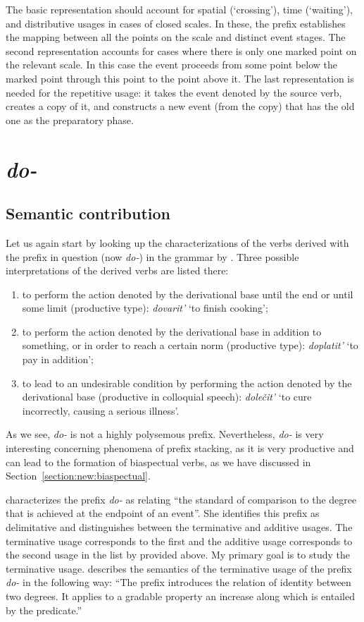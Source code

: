 The basic representation should account for spatial (`crossing'), time (`waiting'), and distributive usages in cases of closed scales. In these, the prefix establishes the mapping between all the points on the scale and distinct event stages. The second representation accounts for cases where there is only one marked point on the relevant scale. In this case the event proceeds from some point below the marked point through this point to the point above it. The last representation is needed for the repetitive usage: it takes the event denoted by the source verb, creates a copy of it, and constructs a new event (from the copy) that has the old one as the preparatory phase.

\section{\textit{do-}}\label{subsection:semantics:do}
\subsection{Semantic contribution}
Let us again start by looking up the characterizations of the verbs derived with the prefix in question (now \textit{do-}) in the grammar by \citet[357--358]{Shvedova:82}. Three possible interpretations of the derived verbs are listed there:
\begin{enumerate}
\item to perform the action denoted by the derivational base until the end or until some limit (productive type): \textit{dovarit'} `to finish cooking';
\item to perform the action denoted by the derivational base in addition to something, or in order to reach a certain norm (productive type): \textit{doplatit'} `to pay in addition';
\item to lead to an undesirable condition by performing the action denoted by the derivational base (productive in colloquial speech): \textit{dole\v{c}it'} `to cure incorrectly, causing a serious illness'.
\end{enumerate}

As we see, \textit{do-} is not a highly polysemous prefix. Nevertheless, \textit{do-} is very interesting concerning phenomena of prefix stacking, as it is very productive and can lead to the formation of biaspectual verbs, as we have discussed in Section~\ref{section:new:biaspectual}. 

\citet[70]{Kagan:book} characterizes the prefix \textit{do-} as relating ``the standard of comparison to the degree that is achieved at the endpoint of an event''. She identifies this prefix as delimitative and distinguishes between the terminative and additive  usages. The terminative usage corresponds to the first and the additive usage corresponds to the second usage in the list by \citet{Shvedova:82} provided above. My primary goal is to study the terminative usage. \citet[72]{Kagan:book} describes the semantics of the terminative usage of the prefix \textit{do-} in the following way: ``The prefix introduces the relation of identity between two degrees. It applies to a gradable property an increase along which is entailed by the predicate.''

